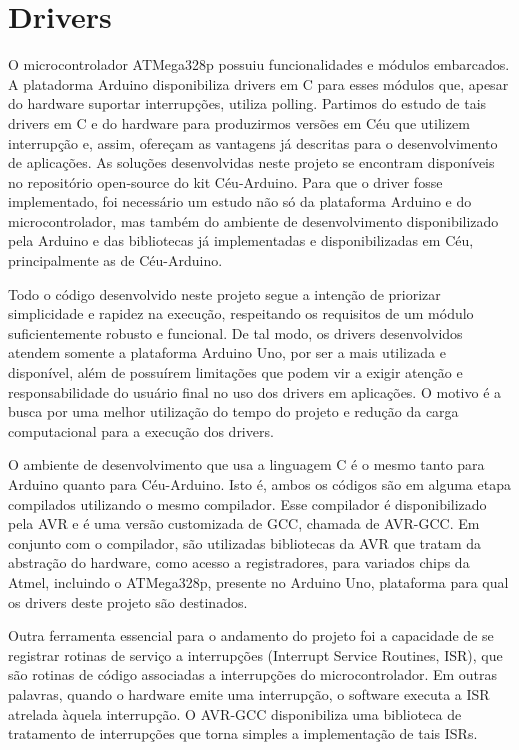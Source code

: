 \documentclass[11pt]{article}
\begin{document}
\section{Drivers}
\tab O microcontrolador ATMega328p possuiu funcionalidades e módulos embarcados. A platadorma Arduino disponibiliza drivers em C para esses módulos que, apesar do hardware suportar interrupções, utiliza polling. Partimos do estudo de tais drivers em C e do hardware para produzirmos versões em Céu que utilizem interrupção e, assim, ofereçam as vantagens já descritas para o desenvolvimento de aplicações. As soluções desenvolvidas neste projeto se encontram disponíveis no repositório open-source do kit Céu-Arduino. Para que o driver fosse implementado, foi necessário um estudo não só da plataforma Arduino e do microcontrolador, mas também do ambiente de desenvolvimento disponibilizado pela Arduino e das bibliotecas já implementadas e disponibilizadas em Céu, principalmente as de Céu-Arduino.
\par Todo o código desenvolvido neste projeto segue a intenção de priorizar simplicidade e rapidez na execução, respeitando os requisitos de um módulo suficientemente robusto e funcional. De tal modo, os drivers desenvolvidos atendem somente a plataforma Arduino Uno, por ser a mais utilizada e disponível, além de possuírem limitações que podem vir a exigir atenção e responsabilidade do usuário final no uso dos drivers em aplicações. O motivo é a busca por uma melhor utilização do tempo do projeto e redução da carga computacional para a execução dos drivers.
\par O ambiente de desenvolvimento que usa a linguagem C é o mesmo tanto para Arduino quanto para Céu-Arduino. Isto é, ambos os códigos são em alguma etapa compilados utilizando o mesmo compilador. Esse compilador é disponibilizado pela AVR e é uma versão customizada de GCC, chamada de AVR-GCC. Em conjunto com o compilador, são utilizadas bibliotecas da AVR que tratam da abstração do hardware, como acesso a registradores, para variados chips da Atmel, incluindo o ATMega328p, presente no Arduino Uno, plataforma para qual os drivers deste projeto são destinados.
\par Outra ferramenta essencial para o andamento do projeto foi a capacidade de se registrar rotinas de serviço a interrupções (Interrupt Service Routines, ISR), que são rotinas de código associadas a interrupções do microcontrolador. Em outras palavras, quando o hardware emite uma interrupção, o software executa a ISR atrelada àquela interrupção. O AVR-GCC disponibiliza uma biblioteca de tratamento de interrupções que torna simples a implementação de tais ISRs.
\end{document}
